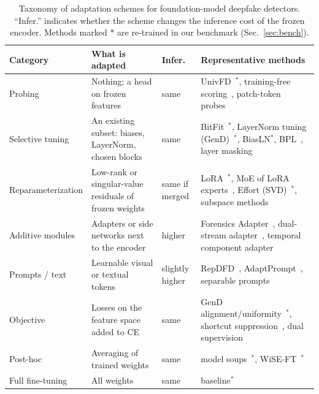 \documentclass[fonts]{icst}
\begin{document}
\begin{table}[!t]
\centering
\caption{Taxonomy of adaptation schemes for foundation-model deepfake detectors. ``Infer.'' indicates whether the scheme changes the inference cost of the frozen encoder. Methods marked $\ast$ are re-trained in our benchmark (Sec.~\ref{sec:bench}).}
\label{tab:taxonomy}
\footnotesize
\begin{tabular}{p{} p{} p{} p{}}
\toprule
\textbf{Category} & \textbf{What is adapted} & \textbf{Infer.} & \textbf{Representative methods} \\
\midrule
Probing & Nothing; a head on frozen features & same & UnivFD~\cite{ojha2023universal}$^\ast$, training-free scoring~\cite{tsai2024trainingfree}, patch-token probes~\cite{abdullah2026tap} \\
Selective tuning & An existing subset: biases, LayerNorm, chosen blocks & same & BitFit~\cite{benzaken2022bitfit}$^\ast$, LayerNorm tuning (GenD)~\cite{yermakov2025gend}$^\ast$, BiasLN$^\ast$, BPL~\cite{xu2026bpl}, layer masking~\cite{zhang2026layermask} \\
Reparameterization & Low-rank or singular-value residuals of frozen weights & same if merged & LoRA~\cite{hu2022lora}$^\ast$, MoE of LoRA experts~\cite{liu2024mole}, Effort (SVD)~\cite{yan2025effort}$^\ast$, subspace methods~\cite{chen2026envsubspace} \\
Additive modules & Adapters or side networks next to the encoder & higher & Forensics Adapter~\cite{cui2025forada}, dual-stream adapter~\cite{liao2026dfa}, temporal component adapter~\cite{han2024fcg} \\
Prompts / text & Learnable visual or textual tokens & slightly higher & RepDFD~\cite{lin2025repdfd}, AdaptPrompt~\cite{jiang2026adaptprompt}, separable prompts~\cite{yang2026separable} \\
Objective & Losses on the feature space added to CE & same & GenD alignment/uniformity~\cite{yermakov2025gend}$^\ast$, shortcut suppression~\cite{wang2026shortcut}, dual supervision~\cite{zhang2026dino} \\
Post-hoc & Averaging of trained weights & same & model soups~\cite{wortsman2022soups}$^\ast$, WiSE-FT~\cite{wortsman2022wiseft}$^\ast$ \\
Full fine-tuning & All weights & same & baseline$^\ast$ \\
\bottomrule
\end{tabular}
\end{table}
\end{document}

